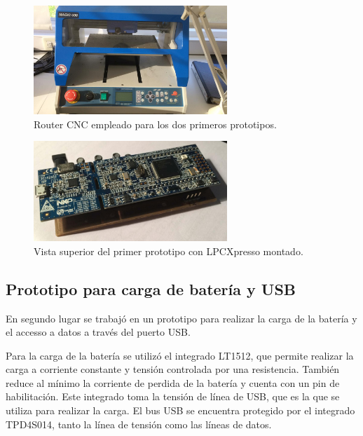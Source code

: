\begin{figure}[!htbp]
	\centering
	
	\includegraphics[width=0.65\textwidth]{./Figures/magic300.jpeg}		
	
	\caption{Router CNC empleado para los dos primeros prototipos.}
	\label{fig:magic300}
\end{figure}

\begin{figure}[!htbp]
	\centering
	\includegraphics[width=0.65\textwidth]{./Figures/prototipo11.jpeg}		
	\caption{Vista superior del primer prototipo con LPCXpresso montado.}
	\label{fig:prototipo1sup}
\end{figure}


\subsection{Prototipo para carga de batería y USB}

En segundo lugar se trabajó en un prototipo para realizar la carga de la batería y el accesso a datos a través del puerto USB. 

Para la carga de la batería se utilizó el integrado LT1512, que permite realizar la carga a corriente constante y tensión controlada por una resistencia. También reduce al mínimo la corriente de perdida de la batería y cuenta con un pin de habilitación. Este integrado toma la tensión de línea de USB, que es la que se utiliza para realizar la carga. El bus USB se encuentra protegido por el integrado TPD4S014, tanto la línea de tensión como las líneas de datos.


